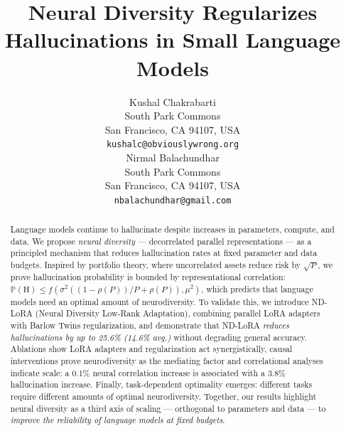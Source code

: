 \documentclass{article} %
\title{Neural Diversity Regularizes Hallucinations in Small Language Models}
\author{Kushal Chakrabarti\\
  South Park Commons\\
  San Francisco, CA 94107, USA\\
  \texttt{kushalc@obviouslywrong.org}
  \\
  \And
  Nirmal Balachundhar \\
  South Park Commons\\
  San Francisco, CA 94107, USA\\
  \texttt{nbalachundhar@gmail.com}
}
\newcommand{\Prob}{\mathbb{P}}
\newcommand{\HALL}{\mathrm{H}} %
\begin{document}
\maketitle

\begin{abstract}
  Language models continue to hallucinate despite increases in parameters, compute, and data. We propose
  \emph{neural diversity} --- decorrelated parallel representations --- as a principled mechanism that
  reduces hallucination rates at fixed parameter and data budgets. Inspired by portfolio theory, where uncorrelated
  assets reduce risk by $\sqrt{P}$, we prove hallucination probability is bounded by representational correlation:
  $\Prob(\HALL) \leq f(\sigma^2((1-\rho(P))/P + \rho(P)), \mu^2)$, which predicts that language models need
  an optimal amount of neurodiversity. To validate this, we introduce ND-LoRA (Neural Diversity Low-Rank
  Adaptation), combining parallel LoRA adapters with Barlow Twins regularization, and demonstrate that
  ND-LoRA \emph{reduces hallucinations by up to 25.6\% (14.6\% avg.)} without degrading general
  accuracy. Ablations show LoRA adapters and regularization act synergistically, causal interventions
  prove neurodiversity as the mediating factor and correlational analyses indicate scale: a 0.1\%
  neural correlation increase is associated with a 3.8\% hallucination increase. Finally, task-dependent
  optimality emerges: different tasks require different amounts of optimal neurodiversity. Together, our
  results highlight neural diversity as a third axis of scaling --- orthogonal to parameters and data --- to
  \emph{improve the reliability of language models at fixed budgets}.
\end{abstract}
\end{document}
